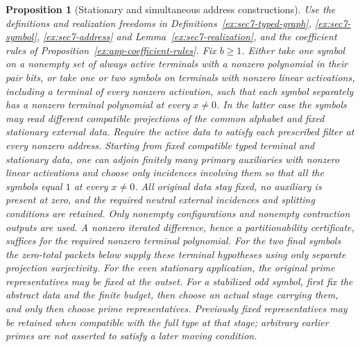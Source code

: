 \documentclass[11pt]{article}
\newtheorem{proposition}[theorem]{Proposition}
\theoremstyle{definition}
\theoremstyle{remark}
\begin{document}
\begin{proposition}[Stationary and simultaneous address constructions]\label{ex:app-simultaneous-address}
Use the definitions and realization freedoms in
Definitions~\ref{ex:sec7-typed-graph}, \ref{ex:sec7-symbol},
\ref{ex:sec7-address} and Lemma~\ref{ex:sec7-realization},
and the coefficient rules of Proposition~\ref{ex:app-coefficient-rules}.
Fix $b\ge1$. Either take one symbol on a nonempty set of always
active terminals with a nonzero polynomial in their pair bits, or
take one or two symbols on terminals with nonzero linear activations,
including a terminal of every nonzero activation, such that each
symbol separately has a nonzero terminal polynomial at every
$x\ne0$. In the latter case the symbols may read different
compatible projections of the common alphabet and fixed stationary
external data. Require the active data to satisfy each prescribed
filter at every nonzero address.
Starting from fixed compatible typed terminal and stationary
data, one can adjoin finitely many primary auxiliaries with nonzero
linear activations and choose only incidences involving them so that
all the symbols equal $1$ at every $x\ne0$. All original data stay
fixed, no auxiliary is present at zero, and the required neutral
external incidences and splitting conditions are retained.
Only nonempty configurations and nonempty contraction outputs are
used. A nonzero iterated difference, hence a partitionability
certificate, suffices for the required nonzero terminal polynomial.
For the two final symbols the zero-total packets below supply these
terminal hypotheses using only separate projection surjectivity.
For the even stationary application, the original prime representatives
may be fixed at the outset. For a stabilized odd symbol, first fix the
abstract data and the finite budget, then choose an actual stage
carrying them, and only then choose prime representatives. Previously
fixed representatives may be retained when compatible with the full
type at that stage; arbitrary earlier primes are not asserted to
satisfy a later moving condition.
\end{proposition}
\end{document}
